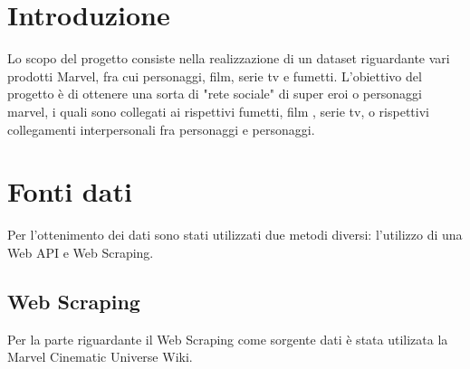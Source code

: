 \documentclass[
10pt, %
a4paper, %
oneside, %
headinclude,footinclude, %
BCOR5mm, %
]{scrartcl}
\begin{document}

\newpage %


\section{Introduzione}
Lo scopo del progetto consiste nella realizzazione di un dataset riguardante vari prodotti Marvel, fra cui personaggi, film, serie tv e fumetti.
L'obiettivo del progetto è di ottenere una sorta di "rete sociale" di super eroi o personaggi marvel, i quali sono collegati ai rispettivi fumetti, film , serie tv, o rispettivi collegamenti interpersonali fra personaggi e personaggi.
 

\section{Fonti dati}
Per l'ottenimento dei dati sono stati utilizzati due metodi diversi: l'utilizzo di una Web API e Web Scraping.

\subsection{Web Scraping}
Per la parte riguardante il Web Scraping come sorgente dati è stata utilizata la Marvel Cinematic Universe Wiki.
\end{document}
